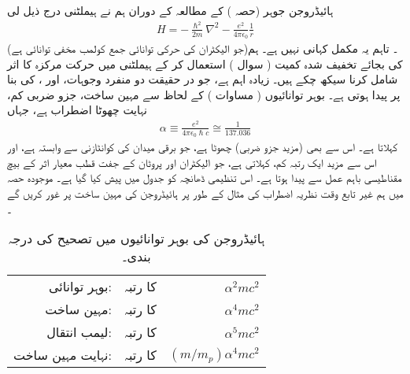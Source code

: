 ہائیڈروجن جوہر    (حصہ  ) کے مطالعہ کے دوران    ہم نے   ہیملٹنی  درج ذیل لی 
\begin{align}\label{مساوات_غیر_مضطرب_بوہر_ہیملٹنی}
H = - \frac{\hslash^2}{2m} \nabla^2 - \frac{e^2}{4 \pi \epsilon_0} \frac{1}{r}
\end{align}
(جو الیکٹران کی حرکی توانائی جمع کولمب مخفی توانائی ہے)۔ تاہم یہ مکمل کہانی نہیں ہے۔  ہم  کی بجائے تخفیف   شدہ  کمیت ( سوال  )   استعمال  کر کے  ہیملٹنی میں حرکت مرکزہ کا اثر شامل  کرنا سیکھ چکے ہیں۔  زیادہ اہم  ہے،  جو در حقیقت دو منفرد وجوہات،   اور ،  کی بنا پر پیدا ہوتی ہے۔ بوہر توانائیوں ( مساوات   )   کے لحاظ سے مہین ساخت،   جزو ضربی  کم،   نہایت چھوٹا اضطراب ہے،  جہاں 
\begin{align}
\alpha \equiv \frac{e^2}{4 \pi \epsilon_0 \hslash c} \cong \frac{1}{137.036}
\end{align} 
  کہلاتا ہے۔ اس سے بھی (مزید   جزو ضربی) چھوٹا   ہے، جو برقی میدان کی کوانٹازنی سے وابستہ ہے،  اور اس سے مزید ایک رتبہ کم،    کہلاتی ہے،  جو الیکٹران اور پروٹان کے جفت قطب  معیار اثر کے بیچ مقناطیسی باہم عمل سے پیدا ہوتا ہے۔  اس   تنظیمی  ڈھانچہ کو جدول    میں پیش کیا گیا ہے۔  موجودہ حصہ میں ہم غیر تابع  وقت نظریہ اضطراب کی مثال کے طور پر ہائیڈروجن کی مہین ساخت پر غور کریں گے ۔
\begin{table}
\caption{ہائیڈروجن کی بوہر توانائیوں میں تصحیح  کی درجہ بندی۔}
\label{جدول_غیر_مضطرب_توانائی_تصحیح_درجہ_بندی}
\centering
\begin{tabular}{rrr}
بوہر توانائی:& کا   رتبہ&$\alpha^2mc^2$\\
مہین ساخت:& کا رتبہ& $\alpha^4mc^2$\\
لیمب انتقال:&کا رتبہ&$\alpha^5mc^2$\\
نہایت مہین ساخت:&کا رتبہ&$(m/m_p)\alpha^4mc^2$
\end{tabular}
\end{table}
